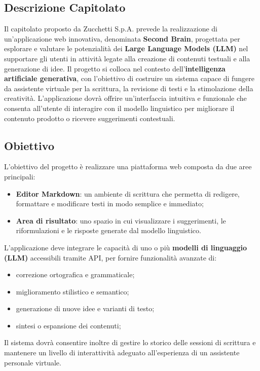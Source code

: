\documentclass[a4paper,12pt]{article}
\begin{document}
{{{    \subsection{Descrizione Capitolato}
        Il capitolato proposto da Zucchetti S.p.A. prevede la realizzazione di un’applicazione web innovativa, denominata \textbf{Second Brain}, progettata per esplorare e valutare le potenzialità dei \textbf{Large Language Models (LLM)} nel supportare gli utenti in attività legate alla creazione di contenuti testuali e alla generazione di idee.
        Il progetto si colloca nel contesto dell’\textbf{intelligenza artificiale generativa}, con l’obiettivo di costruire un sistema capace di fungere da assistente virtuale per la scrittura, la revisione di testi e la stimolazione della creatività.
        L’applicazione dovrà offrire un’interfaccia intuitiva e funzionale che consenta all’utente di interagire con il modello linguistico per migliorare il contenuto prodotto o ricevere suggerimenti contestuali.
    

    \subsection{Obiettivo}
        L’obiettivo del progetto è realizzare una piattaforma web composta da due aree principali:
        \begin{itemize}
            \item \textbf{Editor Markdown}: un ambiente di scrittura che permetta di redigere, formattare e modificare testi in modo semplice e immediato;
            \item \textbf{Area di risultato}: uno spazio in cui visualizzare i suggerimenti, le riformulazioni e le risposte generate dal modello linguistico.
        \end{itemize}
        L’applicazione deve integrare le capacità di uno o più \textbf{modelli di linguaggio (LLM)} accessibili tramite API, per fornire funzionalità avanzate di:
        \begin{itemize}
            \item correzione ortografica e grammaticale;
            \item miglioramento stilistico e semantico;
            \item generazione di nuove idee e varianti di testo;
            \item sintesi o espansione dei contenuti;
        \end{itemize}
        Il sistema dovrà consentire inoltre di gestire lo storico delle sessioni di scrittura e mantenere un livello di interattività adeguato all’esperienza di un assistente personale virtuale.
    

}}}
\end{document}
